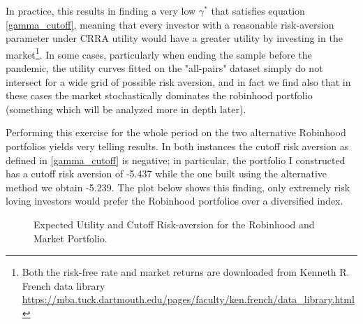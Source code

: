 In practice, this results in finding a very low $\gamma^*$ that satisfies equation \ref{gamma_cutoff}, meaning that every investor with a reasonable risk-aversion parameter under CRRA utility would have a greater utility by investing in the market\footnote{
Both the risk-free rate and market returns are downloaded from Kenneth R. French data library \url{https://mba.tuck.dartmouth.edu/pages/faculty/ken.french/data_library.html}}.
In some cases, particularly when ending the sample before the pandemic, the utility curves fitted on the "all-pairs" dataset simply do not intersect for a wide grid of possible risk aversion,
and in fact we find also that in these cases the market stochastically dominates the robinhood portfolio (something which will be analyzed more in depth later).

Performing this exercise for the whole period on the two alternative Robinhood portfolios yields very telling results.
In both instances the cutoff risk aversion as defined in \ref{gamma_cutoff} is negative; 
in particular, the portfolio I constructed has a cutoff risk aversion of -5.437 while the one built using the alternative method we obtain -5.239.
The plot below shows this finding, only extremely risk loving investors would prefer the Robinhood portfolios over a diversified index.  

\begin{figure}[H]
  \centering
  \hfill
  \caption{Expected Utility and Cutoff Risk-aversion for the Robinhood and Market Portfolio.}
  \label{fig:cutoff_all_sidebyside}
\end{figure}

